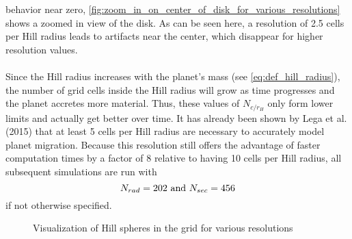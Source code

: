     behavior near zero, 
    \autoref{fig:zoom_in_on_center_of_disk_for_various_resolutions} shows a 
    zoomed in view of the disk. As can be seen here, a resolution of 2.5 
    cells per Hill radius leads to artifacts near the center, which 
    disappear for higher resolution values. \\
    \\
    Since the Hill radius increases with the planet's mass (see 
    \autoref{eq:def_hill_radius}), the number of grid cells inside the Hill 
    radius will grow as time progresses and the planet accretes more 
    material. Thus, these values of $N_{c/r_H}$ only form lower limits and 
    actually get better over time. It has already been shown by
    Lega et al. (2015) that at least 5 cells per Hill radius are necessary 
    to accurately model planet migration.
    Because this resolution still offers the advantage of faster computation 
    times by a factor of 8
    relative to having 10 cells per Hill radius, 
    all subsequent simulations are run with
    $$N_{rad}=202\textnormal{ and }N_{sec}=456$$
    if not otherwise specified.
    \begin{figure}[h!]
      \centering
      \begin{minipage}{.33\linewidth}
        \centering
      \end{minipage}%
      \begin{minipage}{.33\linewidth}
        \centering
      \end{minipage}%
      \begin{minipage}{.33\linewidth}
        \centering
      \end{minipage}
      \caption{Visualization of Hill spheres in the grid for various resolutions}
      \label{fig:hill_sphere_for_various_resolutions}
    \end{figure}

